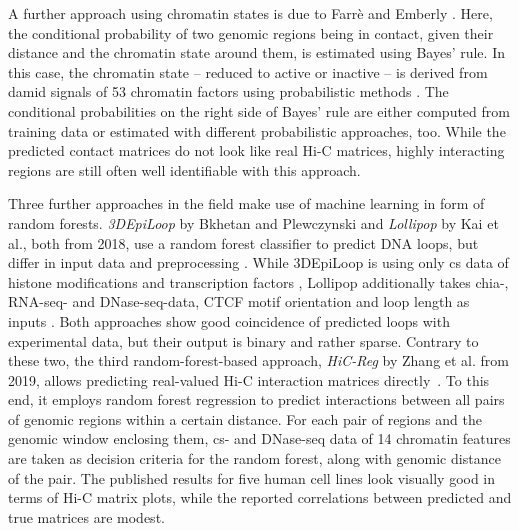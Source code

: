 A further approach using chromatin states is due to Farr\`e and Emberly \cite{Farre2018}.
Here, the conditional probability of two genomic regions being in contact, given their distance and the chromatin state around them,
is estimated using Bayes' rule. 
In this case, the chromatin state -- reduced to active or inactive -- is derived from \acrfull{damid} signals of 53 chromatin factors using probabilistic methods \cite{Zhou2016}.
The conditional probabilities on the right side of Bayes' rule are either computed from training data or estimated with different probabilistic approaches, too.
While the predicted contact matrices do not look like real Hi-C matrices, highly interacting regions are still often well identifiable with this approach.

Three further approaches in the field make use of machine learning in form of random forests. 
\emph{3DEpiLoop} by Bkhetan and Plewczynski and \emph{Lollipop} by Kai et al., 
both from 2018, use a random forest classifier to predict DNA loops, but differ in input data and preprocessing  \cite{Bkhetan2018, Kai2018}.
While 3DEpiLoop is using only \acrshort{cs} data of histone modifications and transcription factors \cite{Bkhetan2018},
Lollipop additionally takes \acrshort{chia}-, RNA-seq- and DNase-seq-data, CTCF motif orientation and loop length as inputs \cite{Kai2018}.
Both approaches show good coincidence of predicted loops with experimental data, but their output is binary and rather sparse.
Contrary to these two, the third random-forest-based approach, \emph{HiC-Reg} by Zhang et al. from 2019, allows predicting real-valued
Hi-C interaction matrices directly~\cite{Zhang2019}. 
To this end, it employs random forest regression to predict interactions
between all pairs of genomic regions within a certain distance. 
For each pair of regions and the genomic window enclosing them, \acrshort{cs}- and DNase-seq data of 14 chromatin features 
are taken as decision criteria for the random forest, along with genomic distance of the pair.
The published results for five human cell lines look visually good in terms of Hi-C matrix plots, while the reported correlations between predicted and true matrices are modest.

